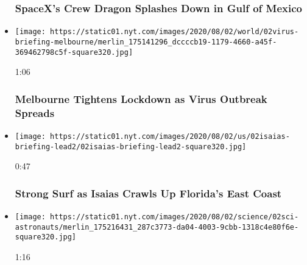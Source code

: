 \begin{itemize}
{  \subsubsection{SpaceX's Crew Dragon Splashes Down in Gulf of
  Mexico}\label{spacexs-crew-dragon-splashes-down-in-gulf-of-mexico}}
\item
  \href{https://www.nytimes.com/video/world/australia/100000007269116/coronavirus-restrictions-melbourne.html?action=click\&module=video-series-bar\&region=header\&pgtype=Article\&playlistId=video/latest-video}{}

  \texttt{[image: https://static01.nyt.com/images/2020/08/02/world/02virus-briefing-melbourne/merlin\_175141296\_dccccb19-1179-4660-a45f-369462798c5f-square320.jpg]}

  1:06

  \hypertarget{melbourne-tightens-lockdown-as-virus-outbreak-spreads}{%
  \subsubsection{Melbourne Tightens Lockdown as Virus Outbreak
  Spreads}\label{melbourne-tightens-lockdown-as-virus-outbreak-spreads}}
\item
  \href{https://www.nytimes.com/video/us/100000007268938/isaias-florida.html?action=click\&module=video-series-bar\&region=header\&pgtype=Article\&playlistId=video/latest-video}{}

  \texttt{[image: https://static01.nyt.com/images/2020/08/02/us/02isaias-briefing-lead2/02isaias-briefing-lead2-square320.jpg]}

  0:47

  \hypertarget{strong-surf-as-isaias-crawls-up-floridas-east-coast}{%
  \subsubsection{Strong Surf as Isaias Crawls Up Florida's East
  Coast}\label{strong-surf-as-isaias-crawls-up-floridas-east-coast}}
\item
  \href{https://www.nytimes.com/video/us/100000007268936/spacex-departs-international-space-station.html?action=click\&module=video-series-bar\&region=header\&pgtype=Article\&playlistId=video/latest-video}{}

  \texttt{[image: https://static01.nyt.com/images/2020/08/02/science/02sci-astronauts/merlin\_175216431\_287c3773-da04-4003-9cbb-1318c4e80f6e-square320.jpg]}

  1:16


\end{itemize}
